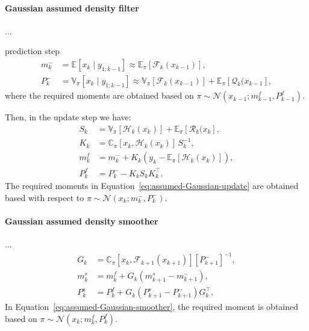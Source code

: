 \documentclass[dissertation,math,vertlayout,pdfa,colorlinks,nologo]{aaltoseries}
\begin{document}
\paragraph*{Gaussian assumed density filter} ...

prediction step
\begin{equation} \label{eq:assumed-Gaussian-prediction}
    \begin{split}
        m_k^- & = \mathbb{E}[x_k \mid y_{1: k-1}] \approx \mathbb{E}_{\pi}[\mathcal{F}_k(x_{k-1})],\\
         P_k^- &= \mathbb{V}_{\pi}[x_k \mid y_{1: k-1}] \approx \mathbb{V}_{\pi}[\mathcal{F}_k(x_{k-1})] + \mathbb{E}_{\pi}[\mathcal{Q}_k(x_{k-1}],
    \end{split}
\end{equation}
where the required moments are obtained based on $\pi \sim \mathcal{N}(x_{k-1}; m^f_{k-1}, P^f_{k-1})$.

Then, in the update step we have:
    \begin{equation} \label{eq:assumed-Gaussian-update}
        \begin{split}
            S_k & = \mathbb{V}_{\pi}[\mathcal{H}_k(x_{k})] + \mathbb{E}_{\pi}[\mathcal{R}_k(x_{k}],\\
            K_k &=  \mathbb{C}_{\pi}[x_k, \mathcal{H}_k(x_{k})] \, S_k^{-1},\\
            m^f_{k} &= m_{k}^- + K_k (y_{k} -  \mathbb{E}_{\pi}[\mathcal{H}_k(x_{k})]),\\
            P^f_{k} &= P_{k}^- - K_k S_k K_k^\top.
        \end{split}
    \end{equation}
The required moments in Equation~\eqref{eq:assumed-Gaussian-update} are obtained based with respect to $\pi \sim \mathcal{N}(x_{k}; m^-_{k}, P^-_{k})$.
\paragraph*{Gaussian assumed density smoother}...
\begin{equation} \label{eq:assumed-Gaussian-smoother}
    \begin{split}
        G_k &= \mathbb{C}_{\pi}[x_k, \mathcal{F}_{k+1}(x_{k+1})] [P^-_{k+1}]^{-1},\\
        m^s_k &= m^f_k + G_k (m^s_{k+1} - m^-_{k+1}),\\
        P^s_k &= P^f_k + G_k (P^s_{k+1} - P^-_{k+1})G_k^\top,
    \end{split}
\end{equation}
In Equation~\eqref{eq:assumed-Gaussian-smoother}, the required moment is obtained based on $\pi \sim \mathcal{N}(x_{k}; m^f_{k}, P^f_{k})$.
\end{document}
